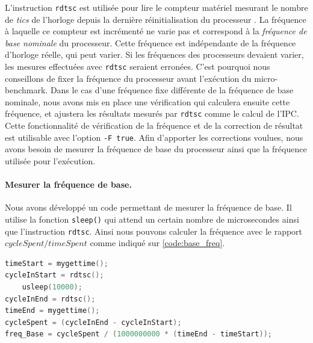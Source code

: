         
        L'instruction \verb|rdtsc| est utilisée pour lire le compteur matériel mesurant le nombre de \textit{tics} de l'horloge depuis la dernière réinitialisation du processeur \cite{code:rdtsc}. La fréquence à laquelle ce compteur est incrémenté ne varie pas et correspond à la \textit{fréquence de base nominale} du processeur. Cette fréquence est indépendante de la fréquence d'horloge réelle, qui peut varier. Si les fréquences des processeurs devaient varier, les mesures effectuées avec \verb|rdtsc| seraient erronées. C'est pourquoi nous conseillons de fixer la fréquence du processeur avant l'exécution du micro-benchmark. Dans le cas d'une fréquence fixe différente de la fréquence de base nominale, nous avons mis en place une vérification qui calculera ensuite cette fréquence, et ajustera les résultats mesurés par \verb|rdtsc| comme le calcul de l'\gls{IPC}. Cette fonctionnalité de vérification de la fréquence et de la correction de résultat est utilisable avec l'option \verb|-F true|. Afin d'apporter les corrections voulues, nous avons besoin de mesurer la fréquence de base du processeur ainsi que la fréquence utilisée pour l'exécution.
        
        \paragraph{Mesurer la fréquence de base.} Nous avons développé un code permettant de mesurer la fréquence de base. Il utilise la fonction \verb=sleep()= qui attend un certain nombre de microsecondes ainsi que l'instruction \verb|rdtsc|. Ainsi nous pouvons calculer la fréquence avec le rapport $cycleSpent / timeSpent$ comme indiqué sur \autoref{code:base_freq}. 
        

\begin{minipage}{0.97\linewidth}         \begin{lstlisting}[label=code:base_freq ,language=C, caption={Code utilisé pour mesurer la fréquence de base du processeur. La fonction \texttt{mygettime()} utilise la fonction \texttt{gettimeofday()}\protect\footnotemark ~permet de mesurer le temps nécessaire à l'exécution du code.}]
timeStart = mygettime();
cycleInStart = rdtsc();
    usleep(10000);
cycleInEnd = rdtsc();
timeEnd = mygettime();
cycleSpent = (cycleInEnd - cycleInStart);
freq_Base = cycleSpent / (1000000000 * (timeEnd - timeStart));
\end{lstlisting} \end{minipage}

